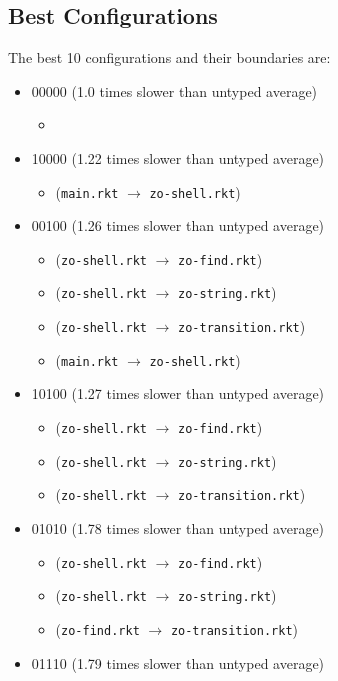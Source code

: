 \documentclass{article}
\newcommand{\mono}[1]{\texttt{#1}}
\begin{document}
\subsection{Best Configurations}
The best 10 configurations and their boundaries are:
\begin{itemize}
\item 00000 (1.0 times slower than untyped average)
  \begin{itemize}
  \item 
  \end{itemize}
\item 10000 (1.22 times slower than untyped average)
  \begin{itemize}
  \item (\mono{main.rkt} $\rightarrow$ \mono{zo-shell.rkt})
  \end{itemize}
\item 00100 (1.26 times slower than untyped average)
  \begin{itemize}
  \item (\mono{zo-shell.rkt} $\rightarrow$ \mono{zo-find.rkt})
  \item (\mono{zo-shell.rkt} $\rightarrow$ \mono{zo-string.rkt})
  \item (\mono{zo-shell.rkt} $\rightarrow$ \mono{zo-transition.rkt})
  \item (\mono{main.rkt} $\rightarrow$ \mono{zo-shell.rkt})
  \end{itemize}
\item 10100 (1.27 times slower than untyped average)
  \begin{itemize}
  \item (\mono{zo-shell.rkt} $\rightarrow$ \mono{zo-find.rkt})
  \item (\mono{zo-shell.rkt} $\rightarrow$ \mono{zo-string.rkt})
  \item (\mono{zo-shell.rkt} $\rightarrow$ \mono{zo-transition.rkt})
  \end{itemize}
\item 01010 (1.78 times slower than untyped average)
  \begin{itemize}
  \item (\mono{zo-shell.rkt} $\rightarrow$ \mono{zo-find.rkt})
  \item (\mono{zo-shell.rkt} $\rightarrow$ \mono{zo-string.rkt})
  \item (\mono{zo-find.rkt} $\rightarrow$ \mono{zo-transition.rkt})
  \end{itemize}
\item 01110 (1.79 times slower than untyped average)

\end{itemize}
\end{document}
